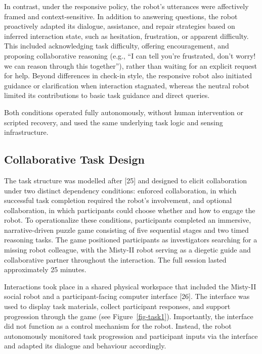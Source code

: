 \documentclass[
  letterpaper,
  DIV=11,
  numbers=noendperiod]{scrartcl}
\begin{document}
In contrast, under the responsive policy, the robot's utterances were
affectively framed and context-sensitive. In addition to answering
questions, the robot proactively adapted its dialogue, assistance, and
repair strategies based on inferred interaction state, such as
hesitation, frustration, or apparent difficulty. This included
acknowledging task difficulty, offering encouragement, and proposing
collaborative reasoning (e.g., ``I can tell you're frustrated, don't
worry! we can reason through this together''), rather than waiting for
an explicit request for help. Beyond differences in check-in style, the
responsive robot also initiated guidance or clarification when
interaction stagnated, whereas the neutral robot limited its
contributions to basic task guidance and direct queries.

Both conditions operated fully autonomously, without human intervention
or scripted recovery, and used the same underlying task logic and
sensing infrastructure.

\subsection{Collaborative Task Design}\label{collaborative-task-design}

The task structure was modelled after {[}25{]} and designed to elicit
collaboration under two distinct dependency conditions: enforced
collaboration, in which successful task completion required the robot's
involvement, and optional collaboration, in which participants could
choose whether and how to engage the robot. To operationalize these
conditions, participants completed an immersive, narrative-driven puzzle
game consisting of five sequential stages and two timed reasoning tasks.
The game positioned participants as investigators searching for a
missing robot colleague, with the Misty-II robot serving as a diegetic
guide and collaborative partner throughout the interaction. The full
session lasted approximately 25 minutes.

Interactions took place in a shared physical workspace that included the
Misty-II social robot and a participant-facing computer interface
{[}26{]}. The interface was used to display task materials, collect
participant responses, and support progression through the game (see
Figure~\ref{fig-task1}). Importantly, the interface did not function as
a control mechanism for the robot. Instead, the robot autonomously
monitored task progression and participant inputs via the interface and
adapted its dialogue and behaviour accordingly.
\end{document}
